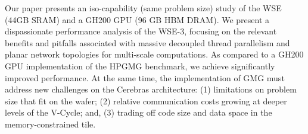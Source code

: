 \documentclass[conference]{IEEEtran}
\begin{document}
        Our paper presents an iso-capability (same problem size) study of the WSE (44GB SRAM) and a GH200 GPU (96 GB HBM DRAM).  We present a dispassionate performance analysis of the WSE-3, focusing on the relevant benefits and pitfalls associated with massive decoupled thread parallelism and planar network topologies for multi-scale computations.  As compared to a GH200 GPU implementation of the HPGMG benchmark, we achieve significantly improved performance.  At the same time,
        the implementation of GMG must address new challenges on the Cerebras architecture: (1) limitations on problem size that fit on the wafer; (2) relative communication costs growing at deeper levels of the V-Cycle; and, (3) trading off code size and data space in the memory-constrained tile.
\end{document}
